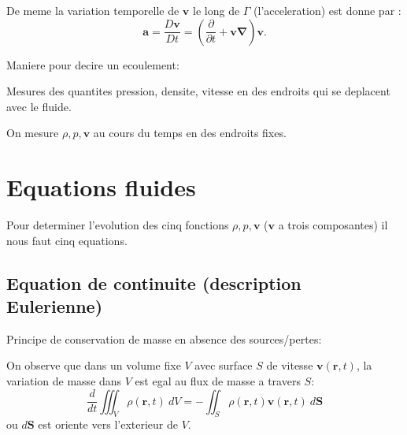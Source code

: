 De meme la variation temporelle de $\boldsymbol{v}$ le long de $\Gamma$ (l'acceleration) est donne par :
$$
\boldsymbol{a}=\frac{D\boldsymbol{v}}{Dt}=\left( \frac{ \partial  }{ \partial t } +\boldsymbol{v\nabla} \right)\boldsymbol{v}.
$$

Maniere pour decire un ecoulement: 
\begin{definition}
Mesures des quantites pression, densite, vitesse en des endroits qui se deplacent avec le fluide.
\end{definition}
\begin{definition}
On mesure $\rho,p,\boldsymbol{v}$ au cours du temps en des endroits fixes.
\end{definition}

\section{Equations fluides}

Pour determiner l'evolution des cinq fonctions $\rho,p,\boldsymbol{v}$ ($\boldsymbol{v}$ a trois composantes) il nous faut cinq equations.

\subsection{Equation de continuite (description Eulerienne)}

Principe de conservation de masse en absence des sources/pertes:

On observe que dans un volume fixe $V$ avec surface $S$ de vitesse $\boldsymbol{v}(\boldsymbol{r,}t)$, la variation de masse dans $V$ est egal au flux de masse a travers $S$:
$$
\frac{d}{dt}\iiint _{V}\rho(\boldsymbol{r},t)~dV=-\iint _{S}\rho(\boldsymbol{r},t)\boldsymbol{v}(\boldsymbol{r},t)~d\boldsymbol{S}
$$
ou $d\boldsymbol{S}$ est oriente vers l'exterieur de $V$. 